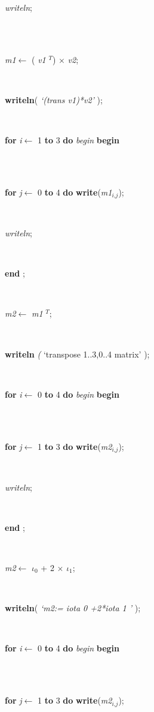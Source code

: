 \documentclass[10pt, a4paper]{article}
\begin{document}
\begin{tabbing}
\parbox{14cm}{\textsf{\textit{writeln}}; }\\
\\
\parbox{14cm}{\textsf{\textit{m1}$\leftarrow$ ( \textit{v1} $^T$) $\times$ \textit{v2}}; }\\
\parbox{14cm}{\textsf{\textbf{writeln}(\textit{\textrm{\textup { `(trans v1)*v2' } }})}; }\\
\+\<\parbox{14cm}{\textsf {\textbf {for } \textsf{\textit{i}$\leftarrow$ 1} \textbf{ to } \textsf{3} \textbf{ do } \textsf{\textit{begin}} \textbf{ begin } }}\\
\\
\parbox{14cm}{\textsf {\textbf {for } \textsf{\textit{j}$\leftarrow$ 0} \textbf{ to } \textsf{4} \textbf{ do } \textsf{\textbf{write}(\textit{m1}$_{\textit{i}, \textit{j}}$)}; }}\\
\parbox{14cm}{\textsf{\textit{writeln}}; }\\
\<\-\parbox{14cm}{\textsf{\textbf{end} ;}}\\
\parbox{14cm}{\textsf{\textit{m2}$\leftarrow$  \textit{m1} $^T$}; }\\
\parbox{14cm}{\textsf{\textbf{writeln} \textit{(} \textrm{\textup { `transpose 1..3,0..4 matrix' } });}}\\
\+\<\parbox{14cm}{\textsf {\textbf {for } \textsf{\textit{i}$\leftarrow$ 0} \textbf{ to } \textsf{4} \textbf{ do } \textsf{\textit{begin}} \textbf{ begin } }}\\
\\
\parbox{14cm}{\textsf {\textbf {for } \textsf{\textit{j}$\leftarrow$ 1} \textbf{ to } \textsf{3} \textbf{ do } \textsf{\textbf{write}(\textit{m2}$_{\textit{i}, \textit{j}}$)}; }}\\
\parbox{14cm}{\textsf{\textit{writeln}}; }\\
\<\-\parbox{14cm}{\textsf{\textbf{end} ;}}\\
\parbox{14cm}{\textsf{\textit{m2}$\leftarrow$ $\iota_{ 0 }$ + 2 $\times$ $\iota_{ 1 }$}; }\\
\parbox{14cm}{\textsf{\textbf{writeln}(\textit{\textrm{\textup { `m2:= iota 0 +2*iota 1 ' } }})}; }\\
\+\<\parbox{14cm}{\textsf {\textbf {for } \textsf{\textit{i}$\leftarrow$ 0} \textbf{ to } \textsf{4} \textbf{ do } \textsf{\textit{begin}} \textbf{ begin } }}\\
\\
\parbox{14cm}{\textsf {\textbf {for } \textsf{\textit{j}$\leftarrow$ 1} \textbf{ to } \textsf{3} \textbf{ do } \textsf{\textbf{write}(\textit{m2}$_{\textit{i}, \textit{j}}$)}; }}\\

\end{tabbing}
\end{document}
